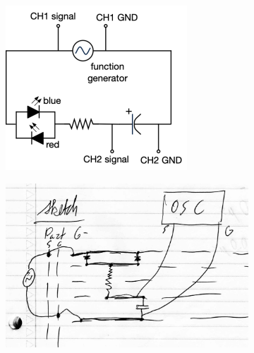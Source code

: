 \documentclass{article}
\begin{document}
        \begin{figure}[H]
            \begin{subfigure}{\textwidth/3}
                \includegraphics[width=\linewidth]{g115.png}
                \caption{}
            \end{subfigure}
            \begin{subfigure}{\textwidth/3}
                \includegraphics[width=\linewidth]{breadboard.png}
                \caption{}
            \end{subfigure}
            \begin{subfigure}{\textwidth/3}

\end{subfigure}
\end{figure}
\end{document}
